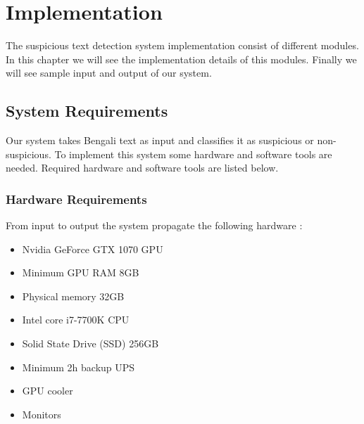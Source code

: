 \documentclass[12pt,a4paper]{report}
\begin{document}






\tableofcontents
\listoffigures
\listoftables
\clearpage
{}

\onehalfspacing  %



    


\chapter{Implementation}
\thispagestyle{empty}
The suspicious text detection system implementation consist of different modules. In this chapter we will see the implementation details of this modules. Finally we will see sample input and output of our system.

\section{System Requirements}
Our system takes Bengali text as input and classifies it as suspicious or non-suspicious. To implement this system some hardware and software tools are needed. Required hardware and software tools are listed below.
\subsection{Hardware Requirements}
From input to output the system propagate the following hardware :
\begin{itemize}
    \item Nvidia GeForce GTX 1070 GPU
    \item Minimum GPU RAM 8GB
    \item Physical memory 32GB
    \item Intel core i7-7700K CPU
    \item Solid State Drive (SSD) 256GB
    \item Minimum 2h backup UPS
    \item GPU cooler
    \item Monitors
\end{itemize}
\clearpage
\end{document}
